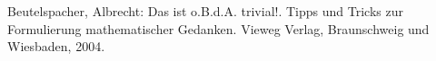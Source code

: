 \begin{thebibliography}{sotief}
     Beutelspacher, Albrecht: Das ist o.B.d.A. trivial!. Tipps und Tricks zur Formulierung mathematischer Gedanken. Vieweg Verlag, Braunschweig und Wiesbaden, 2004.

\end{thebibliography}